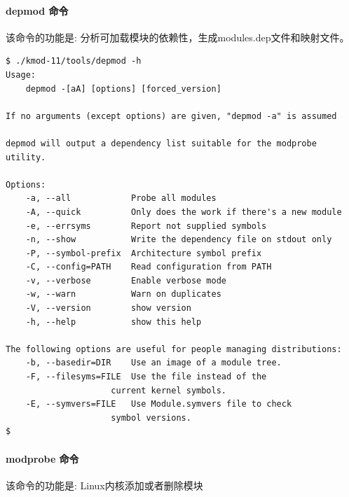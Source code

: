 \documentclass[11pt,a4paper]{article}
\begin{document}
\paragraph{depmod 命令}

该命令的功能是: 分析可加载模块的依赖性，生成modules.dep文件和映射文件。

{\begin{shaded}\begin{verbatim}
$ ./kmod-11/tools/depmod -h
Usage:
    depmod -[aA] [options] [forced_version]

If no arguments (except options) are given, "depmod -a" is assumed

depmod will output a dependency list suitable for the modprobe utility.

Options:
    -a, --all            Probe all modules
    -A, --quick          Only does the work if there's a new module
    -e, --errsyms        Report not supplied symbols
    -n, --show           Write the dependency file on stdout only
    -P, --symbol-prefix  Architecture symbol prefix
    -C, --config=PATH    Read configuration from PATH
    -v, --verbose        Enable verbose mode
    -w, --warn           Warn on duplicates
    -V, --version        show version
    -h, --help           show this help

The following options are useful for people managing distributions:
    -b, --basedir=DIR    Use an image of a module tree.
    -F, --filesyms=FILE  Use the file instead of the
                     current kernel symbols.
    -E, --symvers=FILE   Use Module.symvers file to check
                     symbol versions.
$ 
\end{verbatim}\end{shaded}}
\paragraph{modprobe 命令}

该命令的功能是: Linux内核添加或者删除模块
\end{document}
